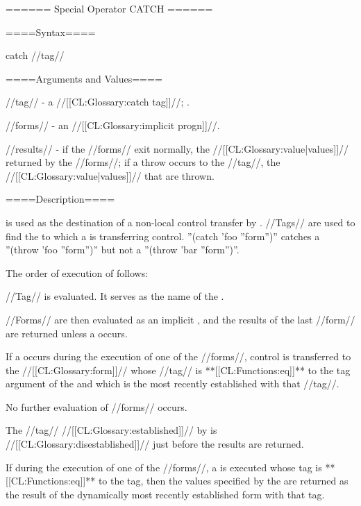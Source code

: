 ====== Special Operator CATCH ======

====Syntax====

\DefspecWithValues catch {//tag// } {}

====Arguments and Values====

//tag// - a //[[CL:Glossary:catch tag]]//; \eval.

//forms// - an //[[CL:Glossary:implicit progn]]//.

//results// - if the //forms// exit normally, the //[[CL:Glossary:value|values]]// returned by the //forms//; if a throw occurs to the //tag//, the //[[CL:Glossary:value|values]]// that are thrown.

====Description====

 is used as the destination of a non-local control transfer by . //Tags// are used to find the  to which a  is transferring control. ''(catch 'foo ''form'')'' catches a ''(throw 'foo ''form'')'' but not a ''(throw 'bar ''form'')''.

The order of execution of  follows:

\beginlist {} //Tag// is evaluated. It serves as the name of the .

 //Forms// are then evaluated as an implicit , and the results of the last //form// are returned unless a  occurs.

 If a  occurs during the execution of one of the //forms//, control is transferred to the  //[[CL:Glossary:form]]// whose //tag// is **[[CL:Functions:eq]]** to the tag argument of the  and which is the most recently established  with that //tag//.

No further evaluation of //forms// occurs.

 The //tag// //[[CL:Glossary:established]]// by  is //[[CL:Glossary:disestablished]]// just before the results are returned.

\endlist

If during the execution of one of the //forms//, a  is executed whose tag is **[[CL:Functions:eq]]** to the  tag, then the values specified by the  are returned as the result of the dynamically most recently established  form with that tag.

